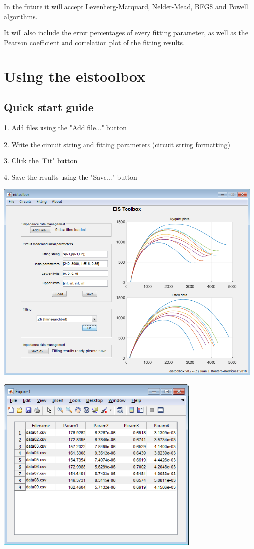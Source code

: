 \documentclass[10pt,a4paper,oneside]{book}
\begin{document}
In the future it will accept Levenberg-Marquard, Nelder-Mead, BFGS and Powell algorithms.

It will also include the error percentages of every fitting parameter, as well as the Pearson coefficient and correlation plot of the fitting results.




\chapter{Using the eistoolbox}

\section{Quick start guide}

1. Add files using the "Add file..." button

2. Write the circuit string and fitting parameters (circuit string formatting)

3. Click the "Fit" button

4. Save the results using the "Save..." button

\includegraphics[width=15cm]{main_screenshot.png}

\includegraphics[width=10cm]{scr_results.png}
\end{document}
